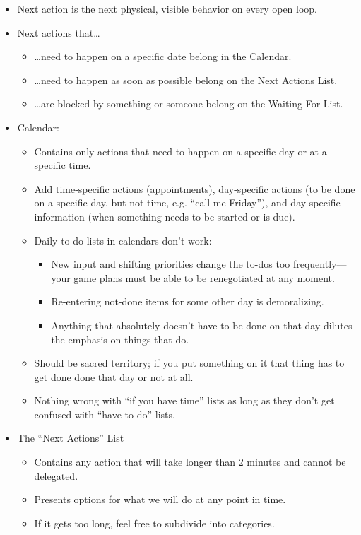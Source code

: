 \documentclass{article}
\begin{document}
\begin{itemize}
  \item Next action is the next physical, visible behavior on every open loop.
  \item Next actions that\ldots
  \begin{itemize}
    \item \ldots need to happen on a specific date belong in the Calendar.
    \item \ldots need to happen as soon as possible belong on the Next Actions List.
    \item \ldots are blocked by something or someone belong on the Waiting For List.
  \end{itemize}
  \item Calendar:
  \begin{itemize}
    \item Contains only actions that need to happen on a specific day or at a specific time.
    \item Add time-specific actions (appointments), day-specific actions (to be done on a specific day, but not time, e.g. ``call me Friday''), and day-specific information (when something needs to be started or is due).
    \item Daily to-do lists in calendars don't work:
    \begin{itemize}
      \item New input and shifting priorities change the to-dos too fre\-quen\-tly---your game plans must be able to be renegotiated at any moment.
      \item Re-entering not-done items for some other day is demoralizing.
      \item Anything that absolutely doesn't have to be done on that day dilutes the emphasis on things that do.
    \end{itemize}
    \item Should be sacred territory; if you put something on it that thing has to get done done that day or not at all.
    \item Nothing wrong with ``if you have time'' lists as long as they don't get confused with ``have to do'' lists.
  \end{itemize}
  \item The ``Next Actions'' List
  \begin{itemize}
    \item Contains any action that will take longer than 2 minutes and cannot be delegated.
    \item Presents options for what we will do at any point in time.
    \item If it gets too long, feel free to subdivide into categories.
  \end{itemize}
\end{itemize}
\end{document}
